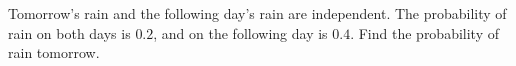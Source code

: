Tomorrow's rain and the following day's rain are independent. The probability of rain on both days is $0.2$, and on the following day is $0.4$. Find the probability of rain tomorrow.
